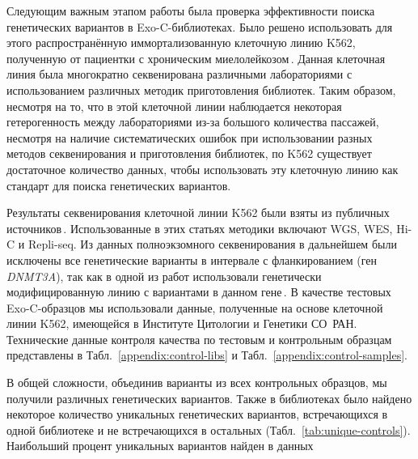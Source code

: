\documentclass[a4paper,14pt]{extarticle}
\newcommand{\genename}[1]{\textit{#1}}
\newcommand{\ecitep}[1]{\textenglish{\citep{#1}}}
\newcommand{\tableref}[1]{Табл.~\ref{#1}}
\begin{document}
Следующим важным этапом работы была проверка эффективности поиска генетических вариантов в Exo-C\hyp{}библиотеках.
Было решено использовать для этого распространённую иммортализованную клеточную линию K562, полученную от пациентки с хроническим миелолейкозом\,\ecitep{Lozzio_1975}.
Данная клеточная линия была многократно секвенирована различными лабораториями с использованием различных методик приготовления библиотек.
Таким образом, несмотря на то, что в этой клеточной линии наблюдается некоторая гетерогенность между лабораториями из-за большого количества пассажей, несмотря на наличие систематических ошибок при использовании разных методов секвенирования и приготовления библиотек, по K562 существует достаточное количество данных, чтобы использовать эту клеточную линию как стандарт для поиска генетических вариантов.

Результаты секвенирования клеточной линии K562 были взяты из публичных источников\,\ecitep{Banaszak_2018,Belaghzal_2017,Dixon_2018,Moquin_2017,Rao_2014,Ray_2019,Wang_2020,Zhou_2019}.
Использованные в этих статьях методики включают WGS, WES, Hi-C и Repli-seq.
Из данных полноэкзомного секвенирования в дальнейшем были исключены все генетические варианты в интервале  с фланкированием  (ген \genename{DNMT3A}), так как в одной из работ использовали генетически модифицированную линию с вариантами в данном гене\,\ecitep{Banaszak_2018}.
В качестве тестовых Exo-C-образцов мы использовали данные, полученные на основе клеточной линии K562, имеющейся в Институте Цитологии и Генетики СО~РАН.
Технические данные контроля качества по тестовым и контрольным образцам представлены в \tableref{appendix:control-libs} и \tableref{appendix:control-samples}.

В общей сложности, объединив варианты из всех контрольных образцов, мы получили  различных генетических вариантов.
Также в библиотеках было найдено некоторое количество уникальных генетических вариантов, встречающихся в одной библиотеке и не встречающихся в остальных (\tableref{tab:unique-controls}).
Наибольший процент уникальных вариантов найден в данных \citeauthor{Banaszak_2018}
\end{document}
